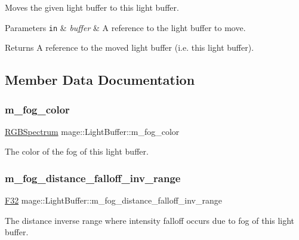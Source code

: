 Moves the given light buffer to this light buffer.


\begin{DoxyParams}[1]{Parameters}
\mbox{\tt in}  & {\em buffer} & A reference to the light buffer to move. \\
\hline
\end{DoxyParams}
\begin{DoxyReturn}{Returns}
A reference to the moved light buffer (i.\+e. this light buffer). 
\end{DoxyReturn}


\subsection{Member Data Documentation}
\hypertarget{structmage_1_1_light_buffer_aa33b98b2880c519eb5be09f78ce4581e}{}\label{structmage_1_1_light_buffer_aa33b98b2880c519eb5be09f78ce4581e} 
\subsubsection{\texorpdfstring{m\+\_\+fog\+\_\+color}{m\_fog\_color}}
{\footnotesize\ttfamily \hyperlink{structmage_1_1_r_g_b_spectrum}{R\+G\+B\+Spectrum} mage\+::\+Light\+Buffer\+::m\+\_\+fog\+\_\+color}

The color of the fog of this light buffer. \hypertarget{structmage_1_1_light_buffer_a224b5927ab16935d36e86212e9e9ec4f}{}\label{structmage_1_1_light_buffer_a224b5927ab16935d36e86212e9e9ec4f} 
\subsubsection{\texorpdfstring{m\+\_\+fog\+\_\+distance\+\_\+falloff\+\_\+inv\+\_\+range}{m\_fog\_distance\_falloff\_inv\_range}}
{\footnotesize\ttfamily \hyperlink{namespacemage_aa97e833b45f06d60a0a9c4fc22ae02c0}{F32} mage\+::\+Light\+Buffer\+::m\+\_\+fog\+\_\+distance\+\_\+falloff\+\_\+inv\+\_\+range}

The distance inverse range where intensity falloff occurs due to fog of this light buffer. \hypertarget{structmage_1_1_light_buffer_a989291bc9195e0bc7606cecf4c56f17a}{}\label{structmage_1_1_light_buffer_a989291bc9195e0bc7606cecf4c56f17a} 
